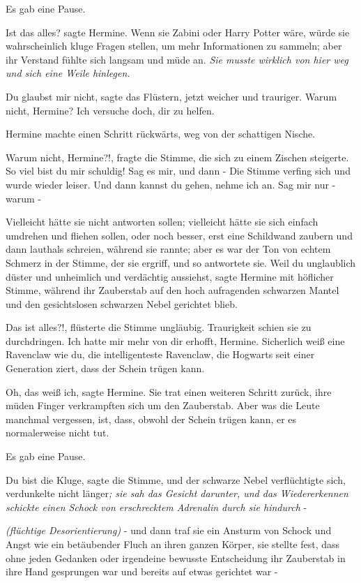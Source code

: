 Es gab eine Pause.

\glqq Ist das alles?\grqq{} sagte Hermine. Wenn sie Zabini oder Harry Potter
wäre, würde sie wahrscheinlich kluge Fragen stellen, um mehr Informationen zu
sammeln; aber ihr Verstand fühlte sich langsam und müde an. \emph{Sie musste
wirklich von hier weg und sich eine Weile hinlegen.}

\glqq Du glaubst mir nicht\grqq{}, sagte das Flüstern, jetzt weicher und
trauriger. \glqq Warum nicht, Hermine? Ich versuche doch, dir zu helfen.\grqq{}

Hermine machte einen Schritt rückwärts, weg von der schattigen Nische.

\glqq Warum nicht, Hermine?!\grqq{}, fragte die Stimme, die sich zu einem
Zischen steigerte. \glqq So viel bist du mir schuldig! Sag es mir, und dann
-\grqq{} Die Stimme verfing sich und wurde wieder leiser. \glqq Und dann kannst
du gehen, nehme ich an. Sag mir nur - warum -\grqq{}

Vielleicht hätte sie nicht antworten sollen; vielleicht hätte sie sich einfach
umdrehen und fliehen sollen, oder noch besser, erst eine Schildwand zaubern und
dann lauthals schreien, während sie rannte; aber es war der Ton von echtem
Schmerz in der Stimme, der sie ergriff, und so antwortete sie. \glqq Weil du
unglaublich düster und unheimlich und verdächtig aussiehst\grqq{}, sagte Hermine
mit höflicher Stimme, während ihr Zauberstab auf den hoch aufragenden schwarzen
Mantel und den gesichtslosen schwarzen Nebel gerichtet blieb.

\glqq Das ist alles?!\grqq{}, flüsterte die Stimme ungläubig. Traurigkeit schien
sie zu durchdringen. \glqq Ich hatte mir mehr von dir erhofft, Hermine.
Sicherlich weiß eine Ravenclaw wie du, die intelligenteste Ravenclaw, die
Hogwarts seit einer Generation ziert, dass der Schein trügen kann.\grqq{}

\glqq Oh, das weiß ich\grqq{}, sagte Hermine. Sie trat einen weiteren Schritt
zurück, ihre müden Finger verkrampften sich um den Zauberstab. \glqq Aber was
die Leute manchmal vergessen, ist, dass, obwohl der Schein trügen kann, er es
normalerweise nicht tut.\grqq{}

Es gab eine Pause.

\glqq Du bist die Kluge\grqq{}, sagte die Stimme, und der schwarze Nebel
verflüchtigte sich, verdunkelte nicht länger\emph{; sie sah das Gesicht
darunter, und das Wiedererkennen schickte einen Schock von erschrecktem
Adrenalin durch sie hindurch} -

\emph{(flüchtige Desorientierung)}
\emph{} - und dann traf sie ein Ansturm von Schock und Angst wie ein
betäubender Fluch an ihren ganzen Körper, sie stellte fest, dass ohne jeden
Gedanken oder irgendeine bewusste Entscheidung ihr Zauberstab in ihre Hand
gesprungen war und bereits auf etwas gerichtet war -


